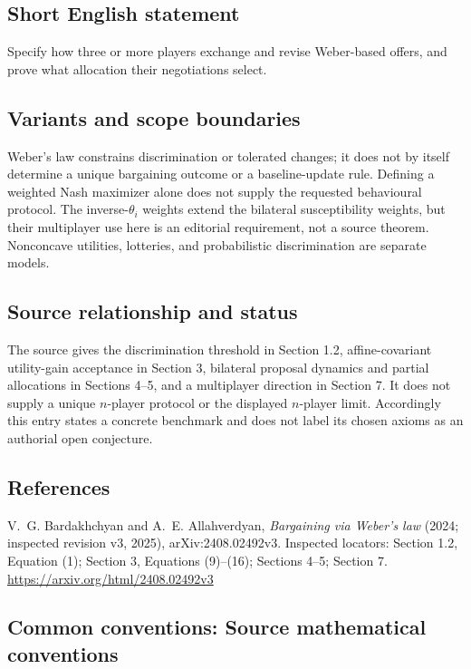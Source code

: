 \documentclass[11pt,a4paper]{article}
\begin{document}
\subsection*{Short English statement}
Specify how three or more players exchange and revise Weber-based offers, and prove what allocation their negotiations select.

\subsection*{Variants and scope boundaries}
Weber's law constrains discrimination or tolerated changes; it does not by itself determine a unique bargaining outcome or a baseline-update rule. Defining a weighted Nash maximizer alone does not supply the requested behavioural protocol. The inverse-$\theta_i$ weights extend the bilateral susceptibility weights, but their multiplayer use here is an editorial requirement, not a source theorem. Nonconcave utilities, lotteries, and probabilistic discrimination are separate models.

\subsection*{Source relationship and status}
The source gives the discrimination threshold in Section 1.2, affine-covariant utility-gain acceptance in Section 3, bilateral proposal dynamics and partial allocations in Sections 4--5, and a multiplayer direction in Section 7. It does not supply a unique $n$-player protocol or the displayed $n$-player limit. Accordingly this entry states a concrete benchmark and does not label its chosen axioms as an authorial open conjecture.

\subsection*{References}
\begingroup\footnotesize\raggedright
\noindent [S1] V.~G. Bardakhchyan and A.~E. Allahverdyan, \emph{Bargaining via Weber's law} (2024; inspected revision v3, 2025), arXiv:2408.02492v3. Inspected locators: Section 1.2, Equation (1); Section 3, Equations (9)--(16); Sections 4--5; Section 7.
\url{https://arxiv.org/html/2408.02492v3}
\par\endgroup

\subsection*{Common conventions: Source mathematical conventions}
\end{document}
